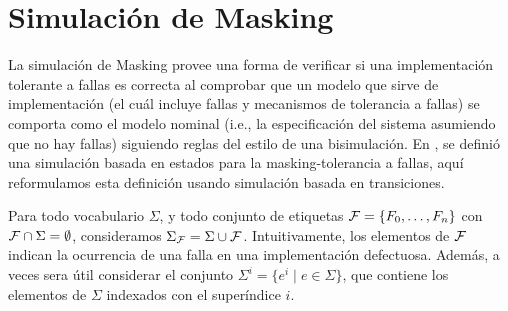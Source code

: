\section{Simulación de Masking} \label{sec:masking_dist_mask}
La simulación de Masking provee una forma de verificar si una implementación tolerante a fallas es correcta al comprobar que un modelo que sirve de implementación (el cuál incluye fallas y mecanismos de tolerancia a fallas) se comporta como el modelo nominal (i.e., la especificación del sistema asumiendo que no hay fallas) siguiendo reglas del estilo de una bisimulación.
En \cite{DemasiCMA17}, se definió una simulación basada en estados para la masking-tolerancia a fallas, aquí reformulamos esta definición usando simulación basada en transiciones. 

Para todo vocabulario $\Sigma$, y todo conjunto de etiquetas $\mathcal{F} = \{F_0, \dots, F_n\}$ con $\mathcal{F} \cap \Sigma = \emptyset$, consideramos $\Sigma_{\mathcal{F}} = \Sigma \cup \mathcal{F}$. 
Intuitivamente, los elementos de $\mathcal{F}$ indican la ocurrencia de una falla en una implementación defectuosa. Además, a veces sera útil considerar el conjunto $\Sigma^i = \{ e^i \mid e \in \Sigma\}$, que contiene los elementos de $\Sigma$ indexados con el superíndice $i$.


